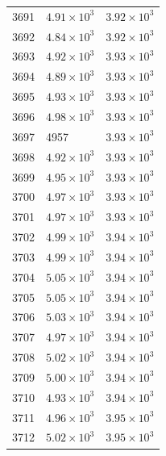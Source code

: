 \begin{table}[H]
\begin{tabular}{lll}
3691 & $\displaystyle 4.91 \times 10^{3}$ & $\displaystyle 3.92 \times 10^{3}$ \\
3692 & $\displaystyle 4.84 \times 10^{3}$ & $\displaystyle 3.92 \times 10^{3}$ \\
3693 & $\displaystyle 4.92 \times 10^{3}$ & $\displaystyle 3.93 \times 10^{3}$ \\
3694 & $\displaystyle 4.89 \times 10^{3}$ & $\displaystyle 3.93 \times 10^{3}$ \\
3695 & $\displaystyle 4.93 \times 10^{3}$ & $\displaystyle 3.93 \times 10^{3}$ \\
3696 & $\displaystyle 4.98 \times 10^{3}$ & $\displaystyle 3.93 \times 10^{3}$ \\
3697 & 4957 & $\displaystyle 3.93 \times 10^{3}$ \\
3698 & $\displaystyle 4.92 \times 10^{3}$ & $\displaystyle 3.93 \times 10^{3}$ \\
3699 & $\displaystyle 4.95 \times 10^{3}$ & $\displaystyle 3.93 \times 10^{3}$ \\
3700 & $\displaystyle 4.97 \times 10^{3}$ & $\displaystyle 3.93 \times 10^{3}$ \\
3701 & $\displaystyle 4.97 \times 10^{3}$ & $\displaystyle 3.93 \times 10^{3}$ \\
3702 & $\displaystyle 4.99 \times 10^{3}$ & $\displaystyle 3.94 \times 10^{3}$ \\
3703 & $\displaystyle 4.99 \times 10^{3}$ & $\displaystyle 3.94 \times 10^{3}$ \\
3704 & $\displaystyle 5.05 \times 10^{3}$ & $\displaystyle 3.94 \times 10^{3}$ \\
3705 & $\displaystyle 5.05 \times 10^{3}$ & $\displaystyle 3.94 \times 10^{3}$ \\
3706 & $\displaystyle 5.03 \times 10^{3}$ & $\displaystyle 3.94 \times 10^{3}$ \\
3707 & $\displaystyle 4.97 \times 10^{3}$ & $\displaystyle 3.94 \times 10^{3}$ \\
3708 & $\displaystyle 5.02 \times 10^{3}$ & $\displaystyle 3.94 \times 10^{3}$ \\
3709 & $\displaystyle 5.00 \times 10^{3}$ & $\displaystyle 3.94 \times 10^{3}$ \\
3710 & $\displaystyle 4.93 \times 10^{3}$ & $\displaystyle 3.94 \times 10^{3}$ \\
3711 & $\displaystyle 4.96 \times 10^{3}$ & $\displaystyle 3.95 \times 10^{3}$ \\
3712 & $\displaystyle 5.02 \times 10^{3}$ & $\displaystyle 3.95 \times 10^{3}$ \\

\end{tabular}
\end{table}
